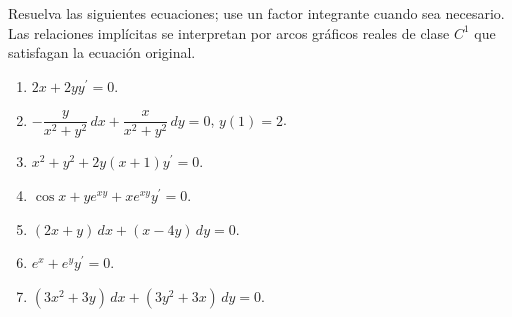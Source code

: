Resuelva las siguientes ecuaciones; use un factor integrante cuando sea necesario. Las relaciones implícitas se interpretan por arcos gráficos reales de clase $C^1$ que satisfagan la ecuación original.

\begin{enumerate}[label=(\alph*),ref=\alph*,leftmargin=*]
\item $2x+2yy^{\prime}=0$.
\item $-\dfrac{y}{x^2+y^2}\,dx+\dfrac{x}{x^2+y^2}\,dy=0$, $y(1)=2$.
\item $x^2+y^2+2y(x+1)y^{\prime}=0$.
\item $\cos x+ye^{xy}+xe^{xy}y^{\prime}=0$.
\item $(2x+y)\,dx+(x-4y)\,dy=0$.
\item $e^x+e^y y^{\prime}=0$.
\item $(3x^2+3y)\,dx+(3y^2+3x)\,dy=0$.
\end{enumerate}
